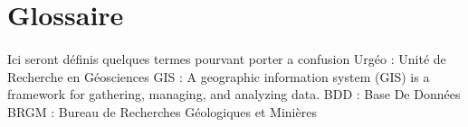 \section{Glossaire}
\paragraph{}Ici seront définis quelques termes pourvant porter a confusion
Urgéo   : Unité de Recherche en Géosciences
    GIS     : A geographic information system (GIS) is a framework for gathering, managing, and analyzing data.
    BDD : Base De Données
    BRGM : Bureau de Recherches Géologiques et Minières